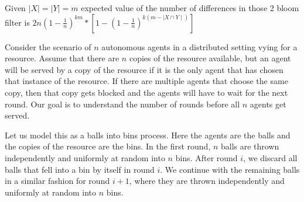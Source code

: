 \documentclass[addpoints,12pt]{exam}
\begin{document}
\begin{questions}
\begin{solution}
            Given $\mid X \mid = \mid Y \mid = m$ expected value of the number of differences in those 2 bloom filter is $2n \left(1 - \frac{1}{n}\right)^{k m} * \left[1 - \left(1 - \frac{1}{n}\right)^{k (m - \mid X\cap Y \mid)}\right]$
            
		\end{solution}
	
		\question Consider the scenario of $n$ autonomous agents in a distributed setting vying for a resource. Assume that there are $n$ copies of the resource available, but an agent will be served by a copy of the resource if it is the only agent that has chosen that instance of the resource. If there are multiple agents that choose the same copy, then that copy gets blocked and the agents will have to wait for the next round. Our goal is to understand the number of rounds before all $n$ agents get served.
		
		Let us model this as a balls into bins process. Here the agents are the balls and the copies of the resource are the bins. In the first round, $n$ balls are thrown independently and uniformly at random into $n$ bins. After round $i$, we discard all balls that fell into a bin by itself in round $i$. We continue with the remaining balls in a similar fashion for round $i+1$, where they are thrown independently and uniformly at random into $n$ bins. 
\end{questions}
\end{document}
